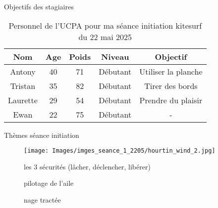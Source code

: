 \documentclass[10pt,a4paper]{beamer}
\begin{document}
\begin{frame}{Objectifs des stagiaires}

\begin{table}
\centering
\begin{tabular}{|c|c|c|c|c|}
        \hline
        \textbf{Nom} & \textbf{Age} & \textbf{Poids}& \textbf{Niveau}     &  \textbf{Objectif} \\ 
        \hline
        Antony        &  40          &  71           &   Débutant          & Utiliser la planche  \\
        Tristan       &  35          & 82            &  Débutant           & Tirer des bords  \\
        Laurette      &  29          & 54            &  Débutant           & Prendre du plaisir \\
        Ewan          &  22          & 75            & Débutant            &  -  \\
        \hline
\end{tabular}
\caption{Personnel de l'UCPA pour ma séance initiation kitesurf du 22 mai 2025}
\end{table}
\end{frame}

\begin{frame}{Thèmes séance initiation}
\begin{figure}
\texttt{[image: Images/imges\_seance\_1\_2205/hourtin\_wind\_2.jpg]} 
\end{figure}
\begin{figure}
\item les 3 sécurités (l\^acher, déclencher, libérer)
\item pilotage de l'aile
\item nage tractée 
\end{figure}
\end{frame}

\end{document}
